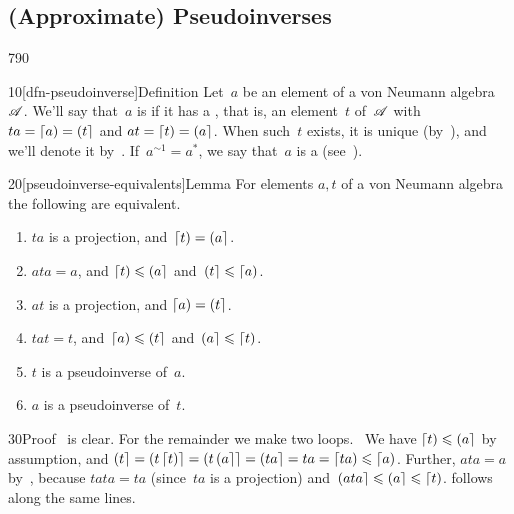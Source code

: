 \subsection{(Approximate) Pseudoinverses}
\begin{parsec}{790}%
\begin{point}{10}[dfn-pseudoinverse]{Definition}%
Let~$a$ be an element of a von Neumann algebra~$\mathscr{A}$.
We'll say that~$a$ is %
if it has a ,
that is,
an element~$t$ of~$\mathscr{A}$
with 
$ta=\left\lceil a\right)=\left(t\right\rceil$
and $at=\left\lceil t\right)=\left(a\right\rceil$.
When such~$t$ exists,
it is unique (by~),
and we'll denote it by~.%
If~$a^{\sim1}=a^*$,
we say that~$a$ is a %
(see~).
\end{point}
\begin{point}{20}[pseudoinverse-equivalents]{Lemma}%
For elements $a,t$ of a von Neumann algebra
the following are equivalent.
\begin{enumerate}
\item
\label{pseudoinverse-1}
$ta$ is a projection, and~$\left\lceil t\right)=\left(a\right\rceil$.
\item
\label{pseudoinverse-2}
$ata=a$, and $\left\lceil t\right)\leqslant \left(a\right\rceil$ and~$\left(t\right\rceil\leqslant \left\lceil a\right)$.
\item
\label{pseudoinverse-3}
$at$ is a projection, and $\left\lceil a\right)=\left(t\right\rceil$.
\item
\label{pseudoinverse-4}
$tat=t$, and~$\left\lceil a\right)\leqslant \left(t\right\rceil$ and~$\left(a\right\rceil\leqslant \left\lceil t\right)$.
\item
\label{pseudoinverse-5}
$t$ is a pseudoinverse of~$a$.
\item
\label{pseudoinverse-6}
$a$ is a pseudoinverse of~$t$.
\end{enumerate}
\begin{point}{30}{Proof}%
\grayed{(\ref{pseudoinverse-5}$\iff$%
\ref{pseudoinverse-6})}\ 
is clear.
For the remainder we  make two loops.
\grayed{(\ref{pseudoinverse-1}$\Longrightarrow$\ref{pseudoinverse-2})}\ 
We have $\left\lceil t\right)\leqslant \left(a\right\rceil$ by assumption,
and $\left(t\right\rceil=\left(t\left\lceil t\right)\right\rceil
=\left(t\left(a\right\rceil\right\rceil
=\left(ta\right\rceil=ta=\left\lceil ta\right)\leqslant\left\lceil a\right)$.
Further, $ata=a$
by~,
because $tata=ta$ (since~$ta$ is a projection)
and~$\left(ata\right\rceil\leqslant \left(a\right\rceil\leqslant\left\lceil t\right)$.
\grayed{(\ref{pseudoinverse-3}$\Longrightarrow$\ref{pseudoinverse-4})} 
follows along the same lines.

\end{point}
\end{point}
\end{parsec}
